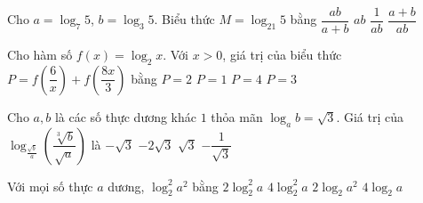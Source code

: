 \begin{ex}%
	Cho $a=\log _7 5$, $b=\log _3  5$. Biểu thức $M=\log _{21} 5$ bằng
	\choice 
		 {\True $\dfrac{a b}{a+b}$}
		 {$a b$}
		{$\dfrac{1}{a b}$} 
		 {$\dfrac{a+b}{a b}$}
\end{ex}

\begin{ex}%
	Cho hàm số  $f\left(x\right)=\log_{2}x$. Với $x>0$, giá trị của biểu thức $P=f\left(\dfrac{6}{x}\right)+f\left(\dfrac{8x}{3}\right)$ bằng
	\choice 
		 {$P=2$}
		{$P=1$} 
		{\True $P=4$} 
		 {$P=3$}
\end{ex}

\begin{ex}%
	Cho $a, b$ là các số thực dương khác $1$ thỏa mãn $\log_{a}b=\sqrt{3}$. Giá  trị của $\log_{\tfrac{\sqrt{b}}{a}}\left(\dfrac{\sqrt[3]{b}}{\sqrt{a}}\right)$ là
	 \choice
		 {$-\sqrt{3}$}
		{$-2\sqrt{3}$} 
		{$\sqrt{3}$} 
		 {\True $-\dfrac{1}{\sqrt{3}}$}
\end{ex}

\begin{ex}%
	Với mọi số thực  $a$ dương, $\log_2^2a^2$ bằng
	\choice 
		{$  2\log_2^2a$}
		 {\True $ 4\log_2^2a$}
		 {$ 2\log_2a^2$}
		{$ 4\log_2a$} 
\end{ex}

